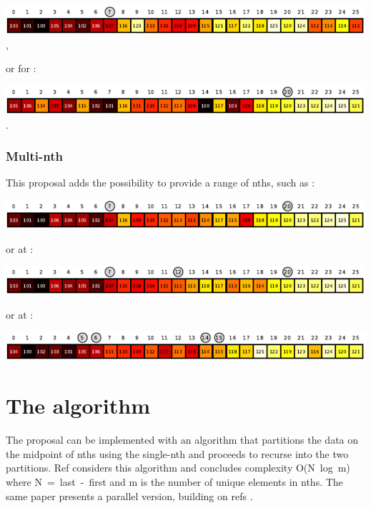 \includegraphics[width=0.999\textwidth]{plotting/figs/1a.pdf},

or for :

\includegraphics[width=0.999\textwidth]{plotting/figs/1b.pdf}.

\subsubsection*{Multi-nth }

This proposal adds the possibility to provide a range of nths, such as  :

\includegraphics[width=0.999\textwidth]{plotting/figs/2.pdf}

or at :

\includegraphics[width=0.999\textwidth]{plotting/figs/3.pdf}

or  at :

\includegraphics[width=0.999\textwidth]{plotting/figs/qs.pdf}

\newpage
\section{The algorithm}
\label{Implementation}
\label{Implement}

The proposal can be implemented with an algorithm that partitions the data on the midpoint of nths using the single-nth  and proceeds to recurse into the two partitions. Ref \cite{Alsuwaiyel2001} considers this algorithm and concludes
 complexity \mbox{O(N log m)} where \mbox{N = last - first} and m is the number of unique elements in nths.
The same paper presents a parallel version, building on refs \cite{Akl1984,Akl1989,Shen1997}.


